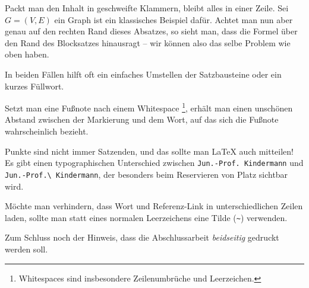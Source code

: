 \documentclass[bachelor,german]{algothesis}
\begin{document}
Packt man den Inhalt in geschweifte Klammern, bleibt alles in einer Zeile. 
Sei ${G=(V,E)}$ ein Graph ist ein klassisches Beispiel dafür.
Achtet man nun aber genau auf den rechten Rand dieses Absatzes, so sieht man, dass die Formel über den Rand des Blocksatzes hinausragt -- wir können also das selbe Problem wie oben haben.

In beiden Fällen hilft oft ein einfaches Umstellen der Satzbausteine oder ein kurzes Füllwort.

Setzt man eine Fußnote nach einem Whitespace 
\footnote{Whitespaces sind insbesondere Zeilenumbrüche und Leerzeichen.}, erhält man einen unschönen Abstand zwischen der Markierung und dem Wort, auf das sich die Fußnote wahrscheinlich bezieht.

Punkte sind nicht immer Satzenden, und das sollte man \LaTeX{} auch mitteilen!
Es gibt einen typographischen Unterschied zwischen \verb+Jun.-Prof. Kindermann+ und \verb+Jun.-Prof.\ Kindermann+, der besonders beim Reservieren von Platz sichtbar wird.

Möchte man verhindern, dass Wort und Referenz-Link in unterschiedlichen Zeilen laden, sollte man statt eines normalen Leerzeichens eine Tilde (\verb+~+) verwenden.

Zum Schluss noch der Hinweis, dass die Abschlussarbeit \emph{beidseitig} gedruckt werden soll.

\clearpage


\end{document}
